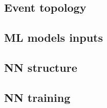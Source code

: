 \subsection{Event topology}


\subsection*{ML models inputs}


\subsection{NN structure}


\subsection{NN training}
